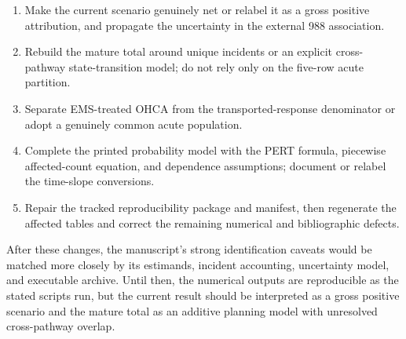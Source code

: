 \documentclass[11pt]{article}
\begin{document}
\begin{enumerate}
\item Make the current scenario genuinely net or relabel it as a gross
positive attribution, and propagate the uncertainty in the external 988
association.
\item Rebuild the mature total around unique incidents or an explicit
cross-pathway state-transition model; do not rely only on the five-row acute
partition.
\item Separate EMS-treated OHCA from the transported-response denominator or
adopt a genuinely common acute population.
\item Complete the printed probability model with the PERT formula,
piecewise affected-count equation, and dependence assumptions; document or
relabel the time-slope conversions.
\item Repair the tracked reproducibility package and manifest, then regenerate
the affected tables and correct the remaining numerical and bibliographic
defects.
\end{enumerate}

After these changes, the manuscript's strong identification caveats would be
matched more closely by its estimands, incident accounting, uncertainty model,
and executable archive.  Until then, the numerical outputs are reproducible as
the stated scripts run, but the current result should be interpreted as a
gross positive scenario and the mature total as an additive planning model
with unresolved cross-pathway overlap.
\end{document}
